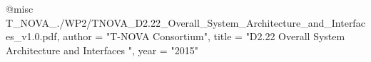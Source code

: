 @misc{ T_NOVA_./WP2/TNOVA_D2.22_Overall_System_Architecture_and_Interfaces_v1.0.pdf,
       author = "{T-NOVA Consortium}",
       title = "D2.22 Overall System Architecture and Interfaces ",
       year = "2015" }
